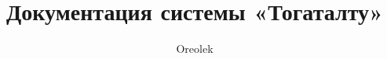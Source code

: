 \usepackage[T2A]{fontenc}
\usepackage{fontspec}
\usepackage{xunicode}
\usepackage{xltxtra}
\usepackage{polyglossia}
\setdefaultlanguage{russian}
\setmainfont{FreeSerif}
\setsansfont{FreeSans}
\setmonofont{FreeMono}
\frenchspacing
\usepackage[labelsep=period]{caption}
\usepackage{indentfirst}

\usepackage{fncychap}
\ChNameVar{\large}
\ChTitleVar{\Large \rm \bfseries}
\ChNameUpperCase

\setcounter{secnumdepth}{-1}
\setcounter{tocdepth}{2}

\usepackage{geometry}
\geometry{left=3cm}
\geometry{right=2cm}
\geometry{top=2cm}
\geometry{bottom=2cm}

\marginparwidth=0cm

\renewcommand{\theenumi}{\arabic{enumi}.}
\renewcommand{\labelenumi}{\arabic{enumi}.}
\renewcommand{\theenumii}{\arabic{enumii}.}
\renewcommand{\labelenumii}{\arabic{enumi}.\arabic{enumii}.}
\renewcommand{\theenumiii}{\arabic{enumiii}.}
\renewcommand{\labelenumiii}{\arabic{enumi}.\arabic{enumii}.\arabic{enumiii}.}

\renewcommand{\baselinestretch}{1.5}

\pagestyle{myheadings}


\title{Документация системы «Тогаталту»}
\author{Oreolek}
\maketitle

\renewcommand{\contentsname}{Содержание}
\setlength{\parskip}{0ex plus 0.5ex minus 0.2ex}
\tableofcontents
\clearpage
